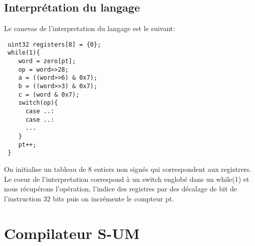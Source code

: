 \documentclass[a4paper,12pt]{report}
\begin{document}
\section{Interprétation du langage}
Le canevas de l'interpretation du langage est le suivant:
\begin{verbatim}
 uint32 registers[8] = {0};
 while(1){
    word = zero[pt];
    op = word>>28;
    a = ((word>>6) & 0x7);
    b = ((word>>3) & 0x7);
    c = (word & 0x7);
    switch(op){
      case ..:
      case ..:
      ...
    }
    pt++;
 }
\end{verbatim}
On initialise un tableau de 8 entiers non signés qui correspondent aux registrers.
Le coeur de l'interpretation correspond à un switch englobé dans un while(1) et nous récupérons l'opération, l'indice des registres 
par des décalage de bit de l'instruction 32 bits puis on incrémente le compteur pt.



\chapter{Compilateur S-UM}
\end{document}
